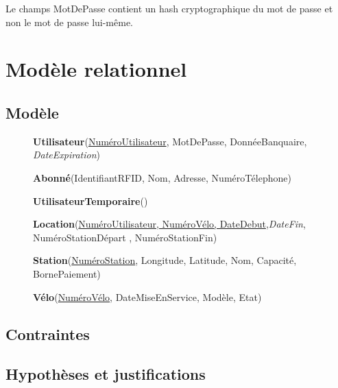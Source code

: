 \documentclass[a4paper,10pt]{article}
\begin{document}
Le champs MotDePasse contient un hash cryptographique du mot de passe et non le mot de passe lui-m\^eme.


\section{Modèle relationnel}
\subsection{Modèle}

\begin{description}
\item[] \textbf{Utilisateur}(\underline{NuméroUtilisateur}, MotDePasse, DonnéeBanquaire, \textit{DateExpiration})

\item[] \textbf{Abonné}(IdentifiantRFID, Nom, Adresse, NuméroTélephone)

\item[] \textbf{UtilisateurTemporaire}()

\item[] \textbf{Location}(\underline{NuméroUtilisateur, NuméroVélo, DateDebut},\textit{DateFin}, NuméroStationDépart , NuméroStationFin) %
	
\item[] \textbf{Station}(\underline{NuméroStation}, Longitude, Latitude, Nom, Capacité, BornePaiement)

 \item[] \textbf{Vélo}(\underline{NuméroVélo}, DateMiseEnService, Modèle, Etat)

\end{description}

\subsection{Contraintes}
\subsection{Hypothèses et justifications}
\end{document}
